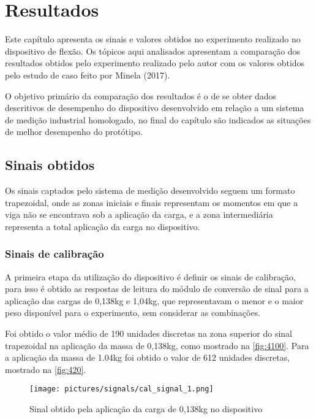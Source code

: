 

\chapter{Resultados}\label{ch:capitulo_resultados}

Este capítulo apresenta os sinais e valores obtidos no experimento realizado no dispositivo de flexão.
Os tópicos aqui analisados apresentam a comparação dos resultados obtidos pelo experimento realizado pelo autor com os valores obtidos pelo
estudo de caso feito por Minela (2017).

O objetivo primário da comparação dos resultados é o de se obter dados descritivos de desempenho do dispositivo desenvolvido em relação a um sistema de medição industrial
homologado, no final do capítulo são indicados as situações de melhor desempenho do protótipo.

\section{Sinais obtidos}

Os sinais captados pelo sistema de medição desenvolvido seguem um formato trapezoidal, onde as zonas iniciais e finais representam os momentos em que a viga não se encontrava
sob a aplicação da carga, e a zona intermediária representa a total aplicação da carga no dispositivo.

\subsection{Sinais de calibração}

A primeira etapa da utilização do dispositivo é definir os sinais de calibração, para isso é obtido as respostas de leitura do módulo de conversão de sinal para a aplicação das cargas
de 0,138kg e 1,04kg, que representavam o menor e o maior peso disponível para o experimento, sem considerar as combinações.

Foi obtido o valor médio de 190 unidades discretas na zona superior do sinal trapezoidal na aplicação da massa de 0,138kg, como mostrado na \autoref{fig:4100}.
Para a aplicação da massa de 1.04kg foi obtido o valor de 612 unidades discretas, mostrado na \autoref{fig:420}.

\begin{figure}[H]
	\caption{\label{fig:4100} Sinal obtido pela aplicação da carga de 0,138kg no dispositivo}
	\begin{center}
		\texttt{[image: pictures/signals/cal\_signal\_1.png]}
	\end{center}
\end{figure}

